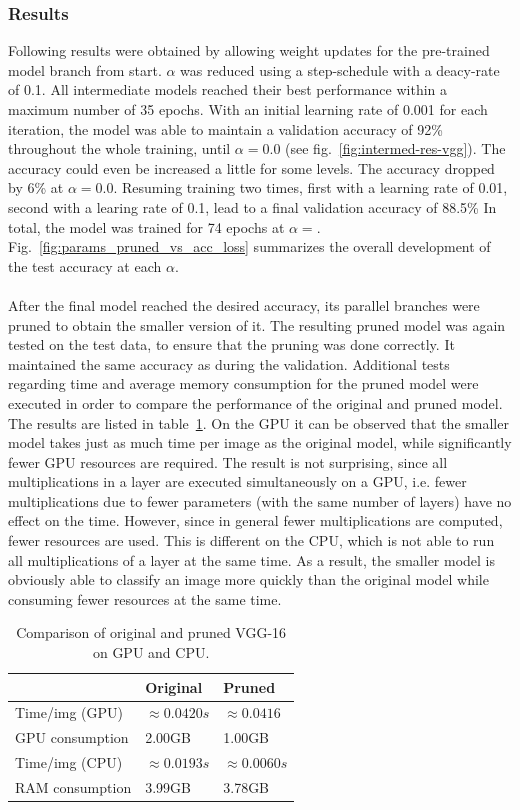 \documentclass[10pt,twocolumn,letterpaper]{article}
\begin{document}
\subsubsection{Results}
Following results were obtained by allowing weight updates for the pre-trained model branch from start.
$\alpha$ was reduced using a step-schedule with a deacy-rate of 0.1.
All intermediate models reached their best performance within a maximum number of 35 epochs.
With an initial learning rate of 0.001 for each iteration, the model was able to maintain a validation accuracy of 92\% throughout the whole training, until $\alpha=0.0$ (see fig.~\ref{fig:intermed-res-vgg}).
The accuracy could even be increased a little for some levels.
The accuracy dropped by 6\% at $\alpha=0.0$.
Resuming training two times, first with a learning rate of 0.01, second with a learing rate of 0.1, lead to a final validation accuracy of 88.5\%
In total, the model was trained for 74 epochs at $\alpha=$.\\
Fig.~\ref{fig:params_pruned_vs_acc_loss} summarizes the overall development of the test accuracy at each $\alpha$.\\\\
After the final model reached the desired accuracy, its parallel branches were pruned to obtain the smaller version of it.
The resulting pruned model was again tested on the test data, to ensure that the pruning was done correctly.
It maintained the same accuracy as during the validation.
Additional tests regarding time and average memory consumption for the pruned model were executed in order to compare the performance of the original and pruned model.
The results are listed in table~\ref{tab:vgg-comparison}.
On the GPU it can be observed that the smaller model takes just as much time per image as the original model, while significantly fewer GPU resources are required.
The result is not surprising, since all multiplications in a layer are executed simultaneously on a GPU, i.e. fewer multiplications due to fewer parameters (with the same number of layers) have no effect on the time.
However, since in general fewer multiplications are computed, fewer resources are used.
This is different on the CPU, which is not able to run all multiplications of a layer at the same time.
As a result, the smaller model is obviously able to classify an image more quickly than the original model while consuming fewer resources at the same time.
\begin{table}[h]
	\centering
	\begin{tabular}{ | l | l | l | }
		\hline
		& Original & Pruned \\ \hline
		Time/img (GPU) & $\approx0.0420s$ & $\approx0.0416$ \\ \hline
		GPU consumption & 2.00GB & 1.00GB \\ \hline
		Time/img (CPU) & $\approx0.0193s$ & $\approx0.0060s$ \\ \hline
		RAM consumption & 3.99GB & 3.78GB \\ \hline
	\end{tabular}
	\caption{\label{tab:vgg-comparison}Comparison of original and pruned VGG-16 on GPU and CPU.}
\end{table}
\end{document}
